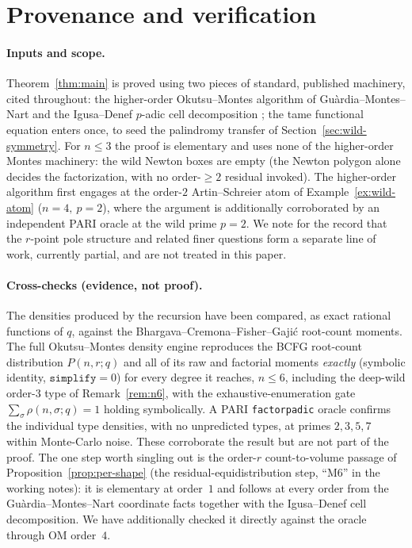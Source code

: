 \documentclass[pdflatex,sn-mathphys-num]{sn-jnl}%
\theoremstyle{plain}
\theoremstyle{definition}
\theoremstyle{remark}
\numberwithin{equation}{section}
\begin{document}
\section{Provenance and verification}\label{sec:provenance}

\paragraph{Inputs and scope.}
Theorem~\ref{thm:main} is proved using two pieces of standard, published machinery,
cited throughout: the higher-order Okutsu--Montes algorithm of
Gu\`ardia--Montes--Nart \cite{gmn2012} and the Igusa--Denef $p$-adic cell
decomposition \cite{denef1991functional,igusa2000introduction}; the tame functional
equation \cite{del_corso_dvornicich_2000,john,caruso2022zeroes} enters once, to seed
the palindromy transfer of Section~\ref{sec:wild-symmetry}. For $n\le3$ the proof is
elementary and uses none of the higher-order Montes machinery: the wild Newton boxes
are empty (the Newton polygon alone decides the factorization, with no order-$\ge2$
residual invoked). The higher-order algorithm first engages at the order-$2$
Artin--Schreier atom of Example~\ref{ex:wild-atom} ($n=4,\ p=2$), where the argument
is additionally corroborated by an independent PARI oracle at the wild prime $p=2$.
We note for the record that the $r$-point pole structure and related finer questions
form a separate line of work, currently partial, and are not treated in this paper.

\paragraph{Cross-checks (evidence, not proof).}
The densities produced by the recursion have been compared, as exact rational
functions of $q$, against the Bhargava--Cremona--Fisher--Gaji\'c root-count
moments. The full Okutsu--Montes density engine reproduces the BCFG root-count
distribution $P(n,r;q)$ and all of its raw and factorial moments \emph{exactly}
(symbolic identity, $\mathtt{simplify}=0$) for every degree it reaches, $n\le 6$,
including the deep-wild order-$3$ type of Remark~\ref{rem:n6}, with the
exhaustive-enumeration gate $\sum_{\sigma}\rho(n,\sigma;q)=1$ holding symbolically.
A PARI \texttt{factorpadic} oracle confirms the individual type densities, with no
unpredicted types, at primes $2,3,5,7$ within Monte-Carlo noise. These corroborate
the result but are not part of the proof. The one step worth singling out is the
order-$r$ count-to-volume passage of Proposition~\ref{prop:per-shape} (the
residual-equidistribution step, ``M6'' in the working notes): it is elementary at
order~$1$ and follows at every order from the Gu\`ardia--Montes--Nart coordinate
facts together with the Igusa--Denef cell decomposition. We have additionally
checked it directly against the oracle through OM order~$4$.
\end{document}
